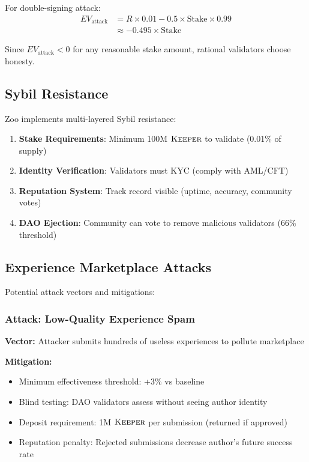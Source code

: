 \documentclass[11pt,letterpaper]{article}
\theoremstyle{definition}
\theoremstyle{remark}
\newcommand{\KEEPER}{\textsc{Keeper}}
\begin{document}
For double-signing attack:
\begin{align}
EV_{\text{attack}} &= R \times 0.01 - 0.5 \times \text{Stake} \times 0.99 \\
&\approx -0.495 \times \text{Stake}
\end{align}

Since $EV_{\text{attack}} < 0$ for any reasonable stake amount, rational validators choose honesty.

\subsection{Sybil Resistance}

Zoo implements multi-layered Sybil resistance:

\begin{enumerate}
\item \textbf{Stake Requirements}: Minimum 100M $\KEEPER$ to validate (0.01\% of supply)
\item \textbf{Identity Verification}: Validators must KYC (comply with AML/CFT)
\item \textbf{Reputation System}: Track record visible (uptime, accuracy, community votes)
\item \textbf{DAO Ejection}: Community can vote to remove malicious validators (66\% threshold)
\end{enumerate}

\subsection{Experience Marketplace Attacks}

Potential attack vectors and mitigations:

\subsubsection{Attack: Low-Quality Experience Spam}

\textbf{Vector:} Attacker submits hundreds of useless experiences to pollute marketplace

\textbf{Mitigation:}
\begin{itemize}
\item Minimum effectiveness threshold: +3\% vs baseline
\item Blind testing: DAO validators assess without seeing author identity
\item Deposit requirement: 1M $\KEEPER$ per submission (returned if approved)
\item Reputation penalty: Rejected submissions decrease author's future success rate
\end{itemize}
\end{document}
